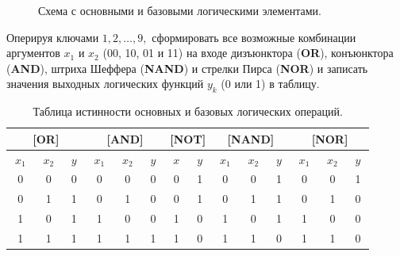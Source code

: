 \documentclass[spec, och, otchet, hidelinks]{SCWorks}
\begin{document}
\begin{figure}[h]
	\caption{Схема с основными и базовыми логическими элементами.}
\end{figure}

\newpage

\par Оперируя ключами $ 1, 2, \dots, 9, $ сформировать все возможные комбинации аргументов $ x_1 $ 
и  $ x_2 $  (00, 10, 01 и 11) на входе дизъюнктора (\textbf{OR}), конъюнктора (\textbf{AND}), 
штриха Шеффера (\textbf{NAND}) и стрелки Пирса (\textbf{NOR}) и записать значения выходных 
логических функций $ y_k $ (0 или 1) в таблицу.

\begin{table}[h]
	\captionsetup{justification=centering}
	\begin{tabular}{|c|c|c|c|c|c|c|c|c|c|c|c|c|c|}	
		\hline	
		\multicolumn{3}{|c|}{[\textbf{OR}]} & \multicolumn{3}{|c|}{[\textbf{AND}]} & 
		\multicolumn{2}{|c|}{[\textbf{NOT}]} & \multicolumn{3}{|c|}{[\textbf{NAND}]} &
		\multicolumn{3}{|c|}{[\textbf{NOR}]} \\
		\hline
		$ \; x_1 \; $ & $ \; x_2 \; $ & $ \; y \; $ & $ \; x_1 \; $ & $ \; x_2 \; $ & $ \; y \; $ 
		& $ \; x \; $ & $ \; y \; $ & $ \; x_1 \; $ & $ \; x_2 \; $ & $ \; y \; $ & $ \; x_1 \; $ 
		& $ \; x_2 \; $ & $ \; y \; $ \\
		\hline
		0 & 0 & 0 & 0 & 0 & 0 & 0 & 1 & 0 & 0 & 1 & 0 & 0 & 1 \\
		\hline
		0 & 1 & 1 & 0 & 1 & 0 & 0 & 1 & 0 & 1 & 1 & 0 & 1 & 0 \\
		\hline
		1 & 0 & 1 & 1 & 0 & 0 & 1 & 0 & 1 & 0 & 1 & 1 & 0 & 0 \\
		\hline
		1 & 1 & 1 & 1 & 1 & 1 & 1 & 0 & 1 & 1 & 0 & 1 & 1 & 0 \\
		\hline	
	\end{tabular}
	\caption{Таблица истинности основных и базовых логических операций.}
\end{table}
\end{document}
